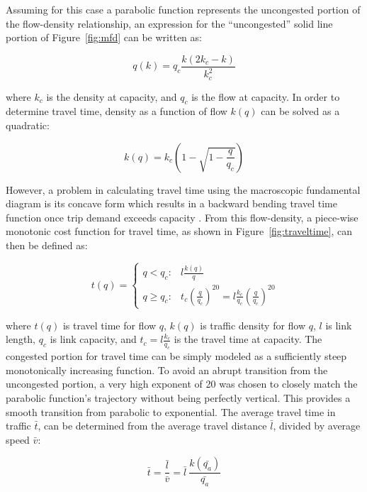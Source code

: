 \documentclass{elsarticle}\usepackage[]{graphicx}\usepackage[]{color}
\begin{document}
Assuming for this case a parabolic function represents the uncongested portion of the flow-density relationship, an expression for the ``uncongested'' solid line portion of Figure~\ref{fig:mfd} can be written as:

\begin{equation}
    q(k) = q_{c}\frac{k\left(2k_{c}-k\right)}{k_{c}^{2}}
\end{equation}

\noindent where $k_c$ is the density at capacity, and $q_c$ is the flow at capacity. In order to determine travel time, density as a function of flow $k(q)$ can be solved as a quadratic:

\begin{equation}
    k(q) = k_c \left(1 - \sqrt{1- \frac{q}{q_c}} \right)
    \label{eq:densityparabolic}
\end{equation}

\noindent However, a problem in calculating travel time using the macroscopic fundamental diagram is its concave form which results in a backward bending travel time function once trip demand exceeds capacity \citep{Gonzales2015}. From this flow-density, a piece-wise monotonic cost function for travel time, as shown in Figure~\ref{fig:traveltime}, can then be defined as:

\begin{equation}\
	t(q) = 
	\begin{cases}
		q  <  q_{c} : & l \frac{k(q)}{q} \\
		q \ge q_{c} : & t_c \left(\frac{q}{q_c}\right)^{20} = l \frac{k_c}{q_c} \left(\frac{q}{q_c}\right)^{20}
	\end{cases}
\end{equation}

\noindent where $t(q)$ is travel time for flow $q$, $k(q)$ is traffic density for flow $q$, $l$ is link length, $q_c$ is link capacity, and $t_c = l\frac{k_c}{q_c}$ is the travel time at capacity. The congested portion for travel time can be simply modeled as a sufficiently steep monotonically increasing function. To avoid an abrupt transition from the uncongested portion, a very high exponent of 20 was chosen to closely match the parabolic function's trajectory without being perfectly vertical. This provides a smooth transition from parabolic to exponential. The average travel time in traffic $\bar{t}$, can be determined from the average travel distance $\bar{l}$, divided by average speed $\bar{v}$:

\begin{equation}
    \bar{t} = \frac{\bar{l}}{\bar{v}} = \bar{l}~\frac{k\left(\bar{q_a}\right)}{\bar{q_a}}
\end{equation}
\end{document}
